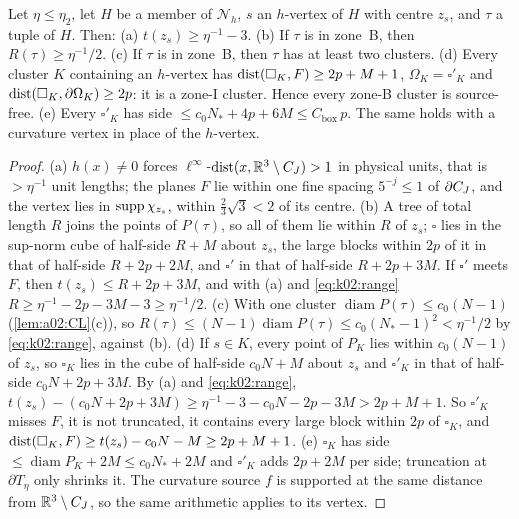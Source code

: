 \begin{lemma}\label{lem:k02:Zh}
Let $\eta\le\eta_2$, let $H$ be a member of $\mathcal N_h$, $s$ an $h$-vertex of $H$ with centre $z_s$, and $\tau$ a tuple of $H$. Then: \textup{(a)} $t(z_s)\ge\eta^{-1}-3$. \textup{(b)} If $\tau$ is in zone~B, then $R(\tau)\ge\eta^{-1}/2$. \textup{(c)} If $\tau$ is in zone~B, then $\tau$ has at least two clusters. \textup{(d)} Every cluster $K$ containing an $h$-vertex has $\operatorname{dist}(\square_K,F)\ge2p+M+1$, $\Omega_K=\square'_K$ and $\operatorname{dist}(\square_K,\partial\Omega_K)\ge2p$: it is a zone-I cluster. Hence every zone-B cluster is source-free. \textup{(e)} Every $\square'_K$ has side $\le c_0N_*+4p+6M\le C_{\mathrm{box}}\,p$. The same holds with a curvature vertex in place of the $h$-vertex.
\end{lemma}
\begin{proof}
(a) $h(x)\ne0$ forces $\ell^\infty$-$\operatorname{dist}(x,\mathbb R^3\setminus C_J)>1$ in physical units, that is $>\eta^{-1}$ unit lengths; the planes $F$ lie within one fine spacing $5^{-j}\le1$ of $\partial C_J$, and the vertex lies in $\operatorname{supp}\chi_{z_s}$, within $\frac23\sqrt3<2$ of its centre. (b) A tree of total length $R$ joins the points of $P(\tau)$, so all of them lie within $R$ of $z_s$; $\square$ lies in the sup-norm cube of half-side $R+M$ about $z_s$, the large blocks within $2p$ of it in that of half-side $R+2p+2M$, and $\square'$ in that of half-side $R+2p+3M$. If $\square'$ meets $F$, then $t(z_s)\le R+2p+3M$, and with (a) and \eqref{eq:k02:range} $R\ge\eta^{-1}-2p-3M-3\ge\eta^{-1}/2$. (c) With one cluster $\operatorname{diam}P(\tau)\le c_0(N-1)$ (\cref{lem:a02:CL}(c)), so $R(\tau)\le(N-1)\operatorname{diam}P(\tau)\le c_0(N_*-1)^2<\eta^{-1}/2$ by \eqref{eq:k02:range}, against (b). (d) If $s\in K$, every point of $P_K$ lies within $c_0(N-1)$ of $z_s$, so $\square_K$ lies in the cube of half-side $c_0N+M$ about $z_s$ and $\square'_K$ in that of half-side $c_0N+2p+3M$. By (a) and \eqref{eq:k02:range}, $t(z_s)-(c_0N+2p+3M)\ge\eta^{-1}-3-c_0N-2p-3M>2p+M+1$. So $\square'_K$ misses $F$, it is not truncated, it contains every large block within $2p$ of $\square_K$, and $\operatorname{dist}(\square_K,F)\ge t(z_s)-c_0N-M\ge2p+M+1$. (e) $\square_K$ has side $\le\operatorname{diam}P_K+2M\le c_0N_*+2M$ and $\square'_K$ adds $2p+2M$ per side; truncation at $\partial T_\eta$ only shrinks it. The curvature source $f$ is supported at the same distance from $\mathbb R^3\setminus C_J$, so the same arithmetic applies to its vertex.
\end{proof}

